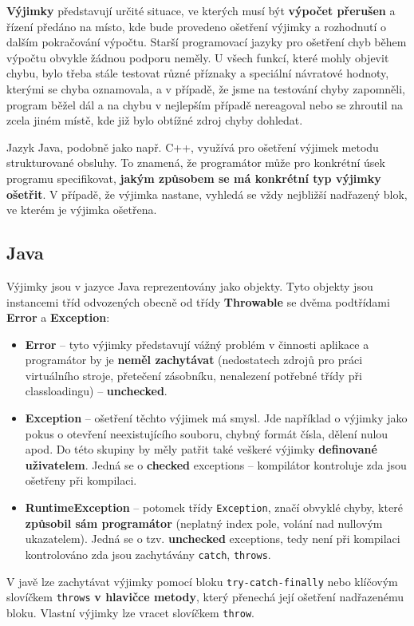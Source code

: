 \textbf{Výjimky} představují určité situace, ve kterých musí být \textbf{výpočet přerušen} a řízení předáno na místo, kde bude provedeno ošetření výjimky a rozhodnutí o dalším pokračování výpočtu. Starší programovací jazyky pro ošetření chyb během výpočtu obvykle žádnou podporu neměly. U všech funkcí, které mohly objevit chybu, bylo třeba stále testovat různé příznaky a speciální návratové hodnoty, kterými se chyba oznamovala, a v případě, že jsme na testování chyby zapomněli, program běžel dál a na chybu v nejlepším případě nereagoval nebo se zhroutil na zcela jiném místě, kde již bylo obtížné zdroj chyby dohledat. 

Jazyk Java, podobně jako např. C++, využívá pro ošetření výjimek metodu strukturované obsluhy. To znamená, že programátor může pro konkrétní úsek programu specifikovat, \textbf{jakým způsobem se má konkrétní typ výjimky ošetřit}. V případě, že výjimka nastane, vyhledá se vždy nejbližší nadřazený blok, ve kterém je výjimka ošetřena.

\subsection{Java}
Výjimky jsou v jazyce Java reprezentovány jako objekty. Tyto objekty jsou instancemi tříd odvozených obecně od třídy \textbf{Throwable} se dvěma podtřídami \textbf{Error} a \textbf{Exception}:
\begin{itemize}
\item \textbf{Error} -- tyto výjimky představují vážný problém v činnosti aplikace a programátor by je \textbf{neměl zachytávat} (nedostatech zdrojů pro práci virtuálního stroje, přetečení zásobníku, nenalezení potřebné třídy při classloadingu) -- \textbf{unchecked}.
\item \textbf{Exception} -- ošetření těchto výjimek má smysl. Jde například o výjimky jako pokus o otevření neexistujícího souboru, chybný formát čísla, dělení nulou apod. Do této skupiny by měly patřit také veškeré výjimky \textbf{definované uživatelem}. Jedná se o \textbf{checked} exceptions -- kompilátor kontroluje zda jsou ošetřeny při kompilaci.
\item \textbf{RuntimeException} -- potomek třídy \texttt{Exception}, značí obvyklé chyby, které \textbf{způsobil sám programátor} (neplatný index pole, volání nad nullovým ukazatelem). Jedná se o tzv. \textbf{unchecked} exceptions, tedy není při kompilaci kontrolováno zda jsou zachytávány \texttt{catch}, \texttt{throws}.
\end{itemize}
V javě lze zachytávat výjimky pomocí bloku \texttt{try-catch-finally} nebo klíčovým slovíčkem \texttt{throws} \textbf{v hlavičce metody}, který přenechá její ošetření nadřazenému bloku. Vlastní výjimky lze vracet slovíčkem \texttt{throw}.

